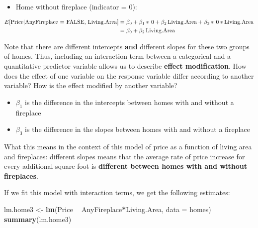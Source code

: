 \documentclass[
]{book}
\newenvironment{Shaded}{\begin{snugshade}}{\end{snugshade}}
\newcommand{\DataTypeTok}[1]{\textcolor[rgb]{0.13,0.29,0.53}{#1}}
\newcommand{\KeywordTok}[1]{\textcolor[rgb]{0.13,0.29,0.53}{\textbf{#1}}}
\newcommand{\NormalTok}[1]{#1}
\newcommand{\OperatorTok}[1]{\textcolor[rgb]{0.81,0.36,0.00}{\textbf{#1}}}
\newcommand{\StringTok}[1]{\textcolor[rgb]{0.31,0.60,0.02}{#1}}
\providecommand{\tightlist}{%
  \setlength{\itemsep}{0pt}\setlength{\parskip}{0pt}}
\begin{document}
\begin{itemize}
\tightlist
\item
  Home without fireplace (indicator = 0):
\end{itemize}

\begin{align*}
E[\hbox{Price}| \hbox{AnyFireplace = FALSE, Living.Area}] &= \beta_0 + \beta_1*\,0 + \beta_2\,\hbox{Living.Area}+ \beta_3*\,0*\hbox{Living.Area}\\
&= \beta_0  + \beta_2\,\hbox{Living.Area}\\
\end{align*}

Note that there are different intercepts \textbf{and} different slopes for these two groups of homes. Thus, including an interaction term between a categorical and a quantitative predictor variable allows us to describe \textbf{effect modification}. How does the effect of one variable on the response variable differ according to another variable? How is the effect modified by another variable?

\begin{itemize}
\tightlist
\item
  \(\beta_1\) is the difference in the intercepts between homes with and without a fireplace
\item
  \(\beta_3\) is the difference in the slopes between homes with and without a fireplace
\end{itemize}

What this means in the context of this model of price as a function of living area and fireplaces: different slopes means that the average rate of price increase for every additional square foot is \textbf{different between homes with and without fireplaces}.

If we fit this model with interaction terms, we get the following estimates:

\begin{Shaded}
\begin{Highlighting}[]
\NormalTok{lm.home3 <-}\StringTok{ }\KeywordTok{lm}\NormalTok{(Price }\OperatorTok{~}\StringTok{ }\NormalTok{AnyFireplace}\OperatorTok{*}\NormalTok{Living.Area, }\DataTypeTok{data =}\NormalTok{ homes)}
\KeywordTok{summary}\NormalTok{(lm.home3)}
\end{Highlighting}
\end{Shaded}
\end{document}
